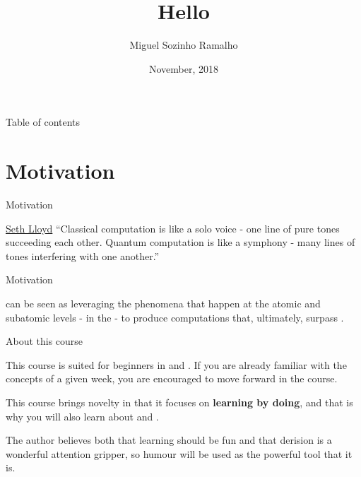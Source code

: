 \documentclass[aspectratio=43]{beamer}
\title{Hello \qw}
\date{November, 2018}
\author[Ramalho]{Miguel Sozinho Ramalho}
\begin{document}
\begin{frame}
	\titlepage
\end{frame}


\begin{frame}{Table of contents}
	\begin{card}
		\tableofcontents
	\end{card}
\end{frame}


\section{Motivation}
\begin{frame}{Motivation}
\begin{card}[Why]
    \begin{chapquote}[2pt]{\href{https://en.wikipedia.org/wiki/Seth_Lloyd}{Seth Lloyd}}
        ``Classical computation is like a solo voice - one line of pure tones succeeding each other. Quantum computation is like a symphony - many lines of tones interfering with one another.''
    \end{chapquote}
\end{card}

\pagenumber
\end{frame}

\begin{frame}{Motivation}
\begin{card}[How]
    \qc can be seen as leveraging the phenomena that happen at the atomic and subatomic levels - in the \qw\xspace- to produce computations that, ultimately, surpass \cc.
\end{card}
\pagenumber
\end{frame}

\begin{frame}{About this course}
\begin{card}
    This course is suited for beginners in \qm and \qc. If you are already familiar with the concepts of a given week, you are encouraged to move forward in the course.

    This course brings novelty in that it focuses on \textbf{learning by doing}, and that is why you will also learn about \qk and \ibmqe.

    The author believes both that learning should be fun and that derision is a wonderful attention gripper, so humour will be used as the powerful tool that it is.
\end{card}
\pagenumber
\end{frame}
\end{document}
